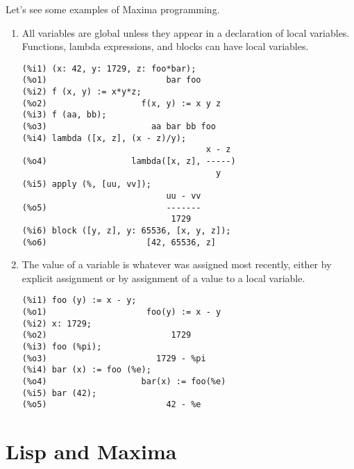 \documentclass[12pt]{article}
\begin{document}
Let's see some examples of Maxima programming.

\begin{enumerate}

\item All variables are global unless they appear in a declaration of local variables.
Functions, lambda expressions, and blocks can have local variables.


\begin{verbatim}
(%i1) (x: 42, y: 1729, z: foo*bar);
(%o1)                        bar foo
(%i2) f (x, y) := x*y*z;
(%o2)                   f(x, y) := x y z
(%i3) f (aa, bb);
(%o3)                     aa bar bb foo
(%i4) lambda ([x, z], (x - z)/y);
                                     x - z
(%o4)                 lambda([x, z], -----)
                                       y
(%i5) apply (%, [uu, vv]);
                             uu - vv
(%o5)                        -------
                              1729
(%i6) block ([y, z], y: 65536, [x, y, z]);
(%o6)                    [42, 65536, z]
\end{verbatim}

\item The value of a variable is whatever was assigned most recently,
either by explicit assignment or by assignment of a value to a local variable.


\begin{verbatim}
(%i1) foo (y) := x - y;
(%o1)                    foo(y) := x - y
(%i2) x: 1729;
(%o2)                         1729
(%i3) foo (%pi);
(%o3)                      1729 - %pi
(%i4) bar (x) := foo (%e);
(%o4)                   bar(x) := foo(%e)
(%i5) bar (42);
(%o5)                        42 - %e
\end{verbatim}

\end{enumerate}

\section{Lisp and Maxima}

\end{document}
